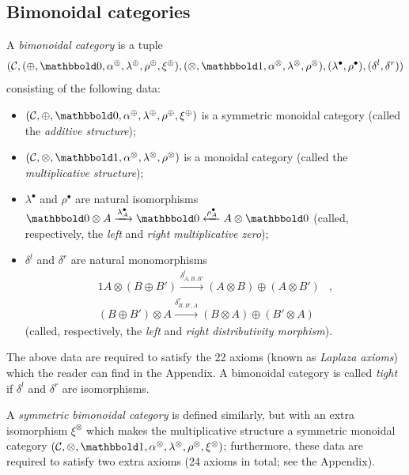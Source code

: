 \documentclass[10pt]{simplearticle}
\newcommand{\tensorunit}{\mathbbold1}
\newcommand{\bbzero}{\mathbbold0}
\begin{document}
\subsection{Bimonoidal categories}
\begin{defn}
A \emph{bimonoidal category} is a tuple
\[
(\mathcal{C},(\oplus,\text{\ensuremath{\bbzero}},\alpha^{\oplus},\lambda^{\oplus},\rho^{\oplus},\xi^{\oplus}),(\otimes,\tensorunit,\alpha^{\otimes},\lambda^{\otimes},\rho^{\otimes}),(\lambda^{\bullet},\rho^{\bullet}),(\delta^{l},\delta^{r}))
\]
consisting of the following data:
\begin{itemize}
\item $(\mathcal{C},\oplus,\text{\ensuremath{\bbzero}},\alpha^{\oplus},\lambda^{\oplus},\rho^{\oplus},\xi^{\oplus})$
is a symmetric monoidal category (called the \emph{additive structure});
\item $(\mathcal{C},\otimes,\tensorunit,\alpha^{\otimes},\lambda^{\otimes},\rho^{\otimes})$
is a monoidal category (called the \emph{multiplicative structure});
\item $\lambda^{\bullet}$ and $\rho^{\bullet}$ are natural isomorphisms
$\bbzero\otimes A\xrightarrow{\lambda^{\bullet}_{A}}\bbzero\xleftarrow{\rho^{\bullet}_{A}}A\otimes\bbzero$
(called, respectively, the \emph{left} and \emph{right multiplicative
zero});
\item $\delta^{l}$ and $\delta^{r}$ are natural monomorphisms
\begin{alignat*}{1}
A\otimes(B\oplus B')\xrightarrow{\delta^{l}_{A,B,B'}}(A\otimes B)\oplus(A\otimes B') & ,\\
(B\oplus B')\otimes A\xrightarrow{\delta^{r}_{B,B',A}}(B\otimes A)\oplus(B'\otimes A)
\end{alignat*}
(called, respectively, the \emph{left} and \emph{right distributivity
morphism}).
\end{itemize}
The above data are required to satisfy the 22 axioms (known as \emph{Laplaza
axioms}) which the reader can find in
the Appendix.
A bimonoidal category is called \emph{tight} if $\delta^{l}$ and
$\delta^{r}$ are isomorphisms.

A \emph{symmetric bimonoidal category} is defined similarly, but with
an extra isomorphism $\xi^{\otimes}$ which makes the multiplicative
structure a symmetric monoidal category $(\mathcal{C},\otimes,\tensorunit,\alpha^{\otimes},\lambda^{\otimes},\rho^{\otimes},\xi^{\otimes})$;
furthermore, these data are required to satisfy two extra axioms (24
axioms in total; see the Appendix).
\end{defn}
\end{document}
